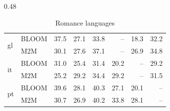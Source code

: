 \documentclass[twoside,11pt]{article}
\begin{document}
\begin{table}[!ht]
\begin{subtable}[t]{0.48\textwidth}
{\begin{tabular}{llrrrrrr}
\midrule
\multirow{2}{*}{gl} & BLOOM & 37.5 & 27.1 & 33.8 & -- & 18.3 & 32.2 \\
 & M2M & 30.1 & 27.6 & 37.1 & -- & 26.9 & 34.8 \\
\midrule
\multirow{2}{*}{it} & BLOOM & 31.0 & 25.4 & 31.4 & 20.2 & -- & 29.2 \\
 & M2M & 25.2 & 29.2 & 34.4 & 29.2 & -- & 31.5 \\
\midrule
\multirow{2}{*}{pt} & BLOOM & 39.6 & 28.1 & 40.3 & 27.1 & 20.1 & -- \\
 & M2M & 30.7 & 26.9 & 40.2 & 33.8 & 28.1 & -- \\
    \bottomrule
  \end{tabular}}
\caption{Romance languages}
\label{tab:flores101_summary:same-fami}
\end{subtable}

\vspace{1em}


\end{table}
\end{document}

